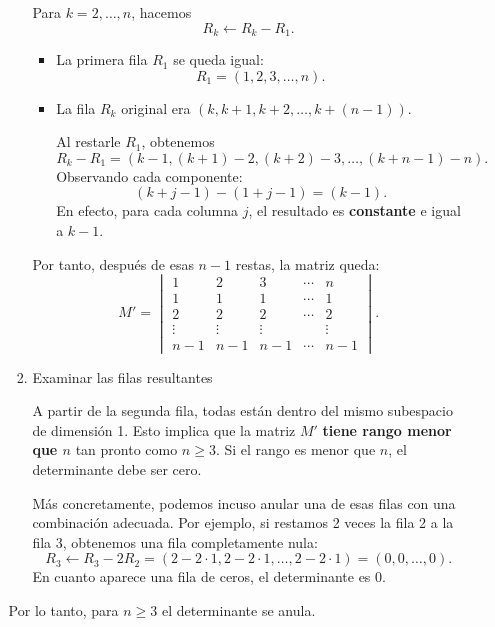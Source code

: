 \begin{enumerate}[label=\color{red}\textbf{\arabic*)}]
\begin{enumerate}[label=\arabic*)]
\begin{enumerate}[label=\arabic*)]
                Para $k=2,\dots,n$, hacemos \[
                R_k\longleftarrow R_k-R_1.
                \] 
                \begin{itemize}[label=\textbullet]
                    \item La primera fila $R_1$ se queda igual: \[
                    R_1=(1,2,3,\dots,n).
                    \] 
                \item La fila $R_k$ original era  $(k,k+1,k+2,\dots,k+(n-1))$.

                    Al restarle $R_1$, obtenemos \[
                    R_k-R_1=(k-1,(k+1)-2, (k+2)-3,\dots,(k+n-1)-n).
                    \] 
                    Observando cada componente: \[
                        (k+j-1)-(1+j-1)=(k-1).
                    \] 
                    En efecto, para cada columna $j$, el resultado es  \textbf{constante} e igual a $k-1$. 
                \end{itemize}
                Por tanto, después de esas $n-1$ restas, la matriz queda:  \[
                M'=\begin{vmatrix} 
                    1 & 2 & 3 & \cdots & n\\
                    1 & 1 & 1 & \cdots & 1\\
                    2 & 2 & 2 & \cdots & 2\\
                    \vdots & \vdots & \vdots & & \vdots\\
                    n-1 & n-1 & n-1 & \cdots & n-1
                \end{vmatrix}. 
                \] 
            \item Examinar las filas resultantes

                A partir de la segunda fila, todas están dentro del mismo subespacio de dimensión 1. Esto implica que la matriz $M'$  \textbf{tiene rango menor que $n$} tan pronto como $n\ge 3$. Si el rango es menor que $n$, el determinante debe ser cero.

                Más concretamente, podemos incuso anular una de esas filas con una combinación adecuada. Por ejemplo, si restamos 2 veces la fila 2 a la fila 3, obtenemos una fila completamente nula: \[
                R_3\longleftarrow R_3-2R_2=(2-2\cdot 1,2-2\cdot 1,\dots,2-2\cdot 1)=(0,0,\dots,0).
                \] 
                En cuanto aparece una fila de ceros, el determinante es $0$.
        \end{enumerate}
        Por lo tanto, para $n\ge 3$ el determinante se anula.
\end{enumerate}


\end{enumerate}
